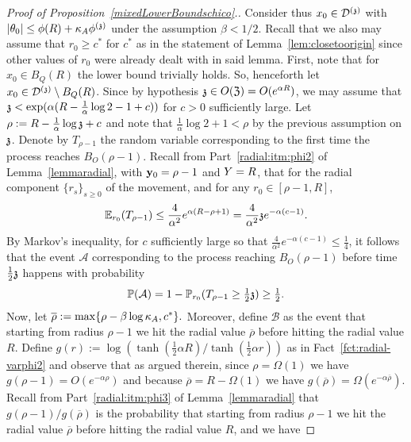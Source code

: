 \begin{proof}[Proof of Proposition~\ref{mixedLowerBoundschico}.]
Consider thus $x_0 \in \dt$ with $|\theta_0| \le \phi(R)+\KA\phi^{(\ss)}$ under the assumption $\beta < 1/2$. Recall that we also may assume that $r_0 \ge c^*$ for $c^*$ as in the statement of Lemma~\ref{lem:closetoorigin} since other values of $r_0$ were already dealt with in said lemma.
First, note that for $x_0 \in B_Q(R)$ the lower bound trivially holds. 
So, henceforth let $x_0 \in \dt \setminus B_Q(R)$. Since by hypothesis $\ss\in O(\mathfrak{Z})=O(e^{\alpha R})$, we may assume that $\ss < \exp(\alpha(R-\frac{1}{\alpha}\log 2 - 1+c))$ for $c>0$ sufficiently large. %
Let $\rho:=R-\frac{1}{\alpha}\log\ss+c$ and note that $\frac{1}{\alpha}\log 2+1 < \rho$ by the previous assumption on $\ss$. 
Denote by $T_{\rho-1}$ the random variable corresponding to the first time the process reaches $B_O(\rho-1)$. Recall from Part~\eqref{radial:itm:phi2} of Lemma~\ref{lemmaradial}, with $\yabs_0=\rho-1$ and $\auxY=R$, that for the radial component $\{r_s\}_{s\geq 0}$ of the movement, and for any $r_0 \in [\rho-1, R]$,
	\[\EE_{r_0}(T_{\rho-1})\leq\frac{4}{\alpha^2}e^{\alpha(R-\rho+1)}
	=\frac{4}{\alpha^2} \ss e^{-\alpha(c-1)}.
	\]
	By Markov's inequality, for $c$ sufficiently large so that  $\frac{4}{\alpha^2}e^{-\alpha(c-1)} \le \frac14$, it follows that the event $\mathcal{A}$ corresponding to the process reaching $B_O(\rho-1)$ 
	before time $\frac12\ss$ happens with
	probability
	\[\PP(\mathcal{A})=1-\PP_{r_0}(T_{\rho-1}\geq \tfrac12 \ss) \ge \tfrac{1}{2}.\]
	Now, let $\overline{\rho}:=\max\{\rho-\beta \log \KA, c^*\}.$ Moreover, define $\mathcal{B}$ as the event that starting from radius $\rho-1$ we hit the radial value $\overline{\rho}$ before hitting the radial value $R$.
	Define $g(r):=\log(\tanh(\frac12\alpha R)/\tanh(\frac12\alpha r))$ as in Fact~\ref{fct:radial-varphi2} and observe that as argued therein,
	since $\rho=\Omega(1)$ we have $g(\rho-1)=O(e^{-\alpha \rho})$ and because
	$\overline{\rho}=R-\Omega(1)$ we have $g(\overline{\rho})=\Omega(e^{-\alpha \overline{\rho}})$. Recall from Part~\eqref{radial:itm:phi3} of Lemma~\ref{lemmaradial} that $g(\rho-1)/g(\overline{\rho})$ is the probability that starting from radius $\rho-1$ we hit the radial value $\overline{\rho}$ before hitting the radial value $R$, and we have

\end{proof}
